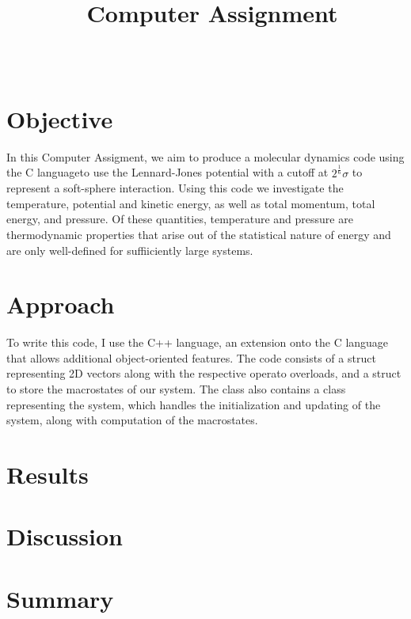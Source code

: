 \documentclass[10pt]{article}
\title{\coursenumber\ Computer Assignment \homeworkcount}
\author{\teachername\\ \studentname}
\date{\duedate}
\begin{document}
\maketitle
\tableofcontents
\newpage

\section{Objective}

In this Computer Assigment, we aim to produce a molecular dynamics code using the C languageto use
the Lennard-Jones potential with a cutoff at $2^\frac{1}{6}\sigma$ to represent a soft-sphere
interaction. Using this code we investigate the temperature, potential and kinetic energy, as well
as total momentum, total energy, and pressure. Of these quantities, temperature and pressure are
thermodynamic properties that arise out of the statistical nature of energy and are only
well-defined for suffiiciently large systems.

\section{Approach}

To write this code, I use the C++ language, an extension onto the C language that allows additional
object-oriented features. The code consists of a struct representing 2D vectors along with the
respective operato overloads, and a struct to store the macrostates of our system. The class also
contains a class representing the system, which handles the initialization and updating of the
system, along with computation of the macrostates.

\section{Results}
\section{Discussion}
\section{Summary}
\end{document}
